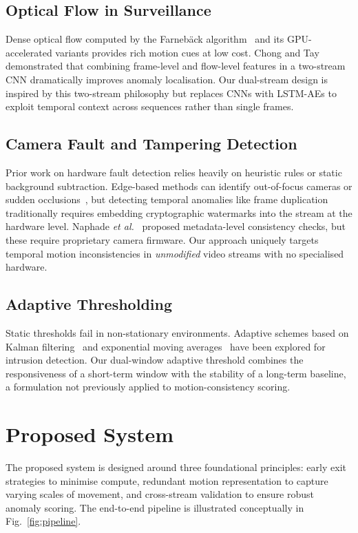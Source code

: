 \documentclass[conference]{IEEEtran}
\begin{document}
\subsection{Optical Flow in Surveillance}
Dense optical flow computed by the Farnebäck algorithm~\cite{ref_farneback}
and its GPU-accelerated variants provides rich motion cues at low cost.
Chong and Tay~\cite{ref_chong} demonstrated that combining frame-level
and flow-level features in a two-stream CNN dramatically improves
anomaly localisation.  Our dual-stream design is inspired by this
two-stream philosophy but replaces CNNs with LSTM-AEs to exploit temporal
context across sequences rather than single frames.

\subsection{Camera Fault and Tampering Detection}
Prior work on hardware fault detection relies heavily on heuristic rules
or static background subtraction.  Edge-based methods can identify
out-of-focus cameras or sudden occlusions~\cite{ref_tamper}, but detecting
temporal anomalies like frame duplication traditionally requires embedding
cryptographic watermarks into the stream at the hardware level.
Naphade \textit{et al.}~\cite{ref_naphade} proposed metadata-level
consistency checks, but these require proprietary camera firmware.  Our
approach uniquely targets temporal motion inconsistencies in
\textit{unmodified} video streams with no specialised hardware.

\subsection{Adaptive Thresholding}
Static thresholds fail in non-stationary environments.  Adaptive schemes
based on Kalman filtering~\cite{ref_kalman} and exponential moving
averages~\cite{ref_ema} have been explored for intrusion detection.  Our
dual-window adaptive threshold combines the responsiveness of a short-term
window with the stability of a long-term baseline, a formulation not
previously applied to motion-consistency scoring.

\section{Proposed System}

The proposed system is designed around three foundational principles:
early exit strategies to minimise compute, redundant motion representation
to capture varying scales of movement, and cross-stream validation to
ensure robust anomaly scoring.  The end-to-end pipeline is illustrated
conceptually in Fig.~\ref{fig:pipeline}.
\end{document}
